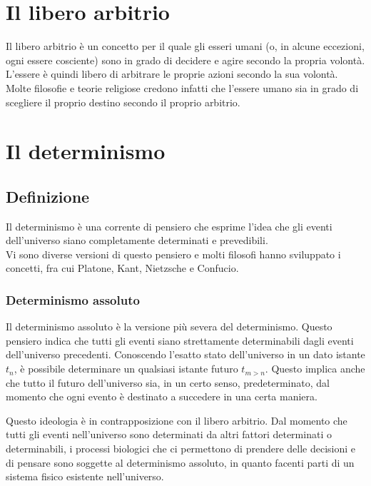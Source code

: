 \documentclass[a4paper, 12pt]{article}
\begin{document}
\section{Il libero arbitrio}

Il libero arbitrio è un concetto per il quale gli esseri umani
(o, in alcune eccezioni, ogni essere cosciente) sono in grado di decidere e agire secondo la propria volontà.
L'essere è quindi libero di arbitrare le proprie azioni secondo la sua volontà.
Molte filosofie e teorie religiose credono infatti che l'essere umano sia in grado
di scegliere il proprio destino secondo il proprio arbitrio.

\pagebreak

\section{Il determinismo}

\subsection{Definizione}

Il determinismo è una corrente di pensiero che esprime l'idea
che gli eventi dell'universo siano completamente determinati e prevedibili.
\\
Vi sono diverse versioni di questo pensiero e
molti filosofi hanno sviluppato i concetti, fra cui Platone, Kant,
Nietzsche e Confucio.

\subsubsection{Determinismo assoluto}

Il determinismo assoluto è la versione più severa del determinismo.
Questo pensiero indica che tutti gli eventi siano strettamente
determinabili dagli eventi dell'universo precedenti.
Conoscendo l'esatto stato dell'universo in un dato istante \(t_n\), è possibile
determinare un qualsiasi istante futuro \(t_{m > n}\).
Questo implica anche che tutto il futuro dell'universo sia,
in un certo senso, predeterminato, dal momento che ogni evento è destinato
a succedere in una certa maniera.

Questo ideologia è in contrapposizione con il libero arbitrio.
Dal momento che tutti gli eventi nell'universo sono determinati da altri fattori determinati
o determinabili, i processi biologici che ci permettono di prendere delle decisioni e di pensare
sono soggette al determinismo assoluto, in quanto facenti parti di un sistema fisico esistente nell'universo.
\end{document}

